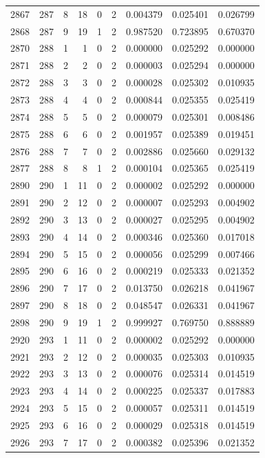 \begin{longtable}{rrrrrrrrr}
2867 & 287 & 8 & 18 & 0 & 2 & 0.004379 & 0.025401 & 0.026799 \\
2868 & 287 & 9 & 19 & 1 & 2 & 0.987520 & 0.723895 & 0.670370 \\
2870 & 288 & 1 & 1 & 0 & 2 & 0.000000 & 0.025292 & 0.000000 \\
2871 & 288 & 2 & 2 & 0 & 2 & 0.000003 & 0.025294 & 0.000000 \\
2872 & 288 & 3 & 3 & 0 & 2 & 0.000028 & 0.025302 & 0.010935 \\
2873 & 288 & 4 & 4 & 0 & 2 & 0.000844 & 0.025355 & 0.025419 \\
2874 & 288 & 5 & 5 & 0 & 2 & 0.000079 & 0.025301 & 0.008486 \\
2875 & 288 & 6 & 6 & 0 & 2 & 0.001957 & 0.025389 & 0.019451 \\
2876 & 288 & 7 & 7 & 0 & 2 & 0.002886 & 0.025660 & 0.029132 \\
2877 & 288 & 8 & 8 & 1 & 2 & 0.000104 & 0.025365 & 0.025419 \\
2890 & 290 & 1 & 11 & 0 & 2 & 0.000002 & 0.025292 & 0.000000 \\
2891 & 290 & 2 & 12 & 0 & 2 & 0.000007 & 0.025293 & 0.004902 \\
2892 & 290 & 3 & 13 & 0 & 2 & 0.000027 & 0.025295 & 0.004902 \\
2893 & 290 & 4 & 14 & 0 & 2 & 0.000346 & 0.025360 & 0.017018 \\
2894 & 290 & 5 & 15 & 0 & 2 & 0.000056 & 0.025299 & 0.007466 \\
2895 & 290 & 6 & 16 & 0 & 2 & 0.000219 & 0.025333 & 0.021352 \\
2896 & 290 & 7 & 17 & 0 & 2 & 0.013750 & 0.026218 & 0.041967 \\
2897 & 290 & 8 & 18 & 0 & 2 & 0.048547 & 0.026331 & 0.041967 \\
2898 & 290 & 9 & 19 & 1 & 2 & 0.999927 & 0.769750 & 0.888889 \\
2920 & 293 & 1 & 11 & 0 & 2 & 0.000002 & 0.025292 & 0.000000 \\
2921 & 293 & 2 & 12 & 0 & 2 & 0.000035 & 0.025303 & 0.010935 \\
2922 & 293 & 3 & 13 & 0 & 2 & 0.000076 & 0.025314 & 0.014519 \\
2923 & 293 & 4 & 14 & 0 & 2 & 0.000225 & 0.025337 & 0.017883 \\
2924 & 293 & 5 & 15 & 0 & 2 & 0.000057 & 0.025311 & 0.014519 \\
2925 & 293 & 6 & 16 & 0 & 2 & 0.000029 & 0.025318 & 0.014519 \\
2926 & 293 & 7 & 17 & 0 & 2 & 0.000382 & 0.025396 & 0.021352 \\

\end{longtable}
